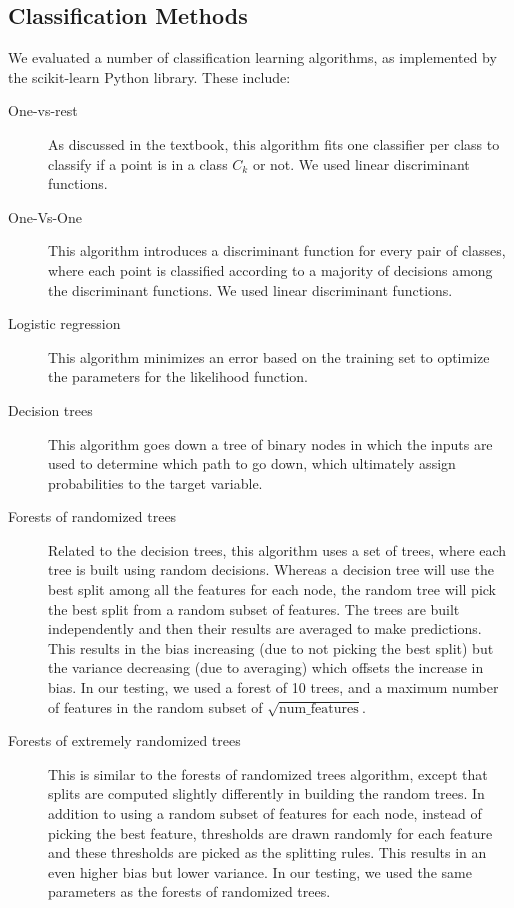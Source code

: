 \documentclass[11pt]{amsart}
\begin{document}
\subsection{Classification Methods}
We evaluated a number of classification learning algorithms, as implemented by the scikit-learn Python library. These include:
\begin{description}
  \item[One-vs-rest] As discussed in the textbook, this algorithm fits one classifier per class to classify if a point is in a class $C_k$ or not. We used linear discriminant functions.
  \item[One-Vs-One] This algorithm introduces a discriminant function for every pair of classes, where each point is classified according to a majority of decisions among the discriminant functions. We used linear discriminant functions.
  \item[Logistic regression] This algorithm minimizes an error based on the training set to optimize the parameters for the likelihood function.
  \item[Decision trees] This algorithm goes down a tree of binary nodes in which the inputs are used to determine which path to go down, which ultimately assign probabilities to the target variable. 
  \item[Forests of randomized trees] Related to the decision trees, this algorithm uses a set of trees, where each tree is built using random decisions. Whereas a decision tree will use the best split among all the features for each node, the random tree will pick the best split from a random subset of features. The trees are built independently and then their results are averaged to make predictions. This results in the bias increasing (due to not picking the best split) but the variance decreasing (due to averaging) which offsets the increase in bias. In our testing, we used a forest of 10 trees, and a maximum number of features in the random subset of $\sqrt{\text{num\_features}}$.
  \item[Forests of extremely randomized trees] This is similar to the forests of randomized trees algorithm, except that splits are computed slightly differently in building the random trees. In addition to using a random subset of features for each node, instead of picking the best feature, thresholds are drawn randomly for each feature and these thresholds are picked as the splitting rules. This results in an even higher bias but lower variance. In our testing, we used the same parameters as the forests of randomized trees.
\end{description}
\end{document}
